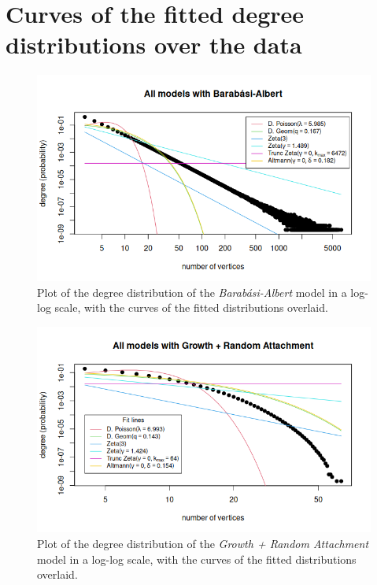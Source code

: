 \newpage
\section{Curves of the fitted degree distributions over the data} \label{app:degseq}

\begin{figure}[ht]
\centering
\includegraphics[width=0.8\linewidth]{figures/degseq_fits/BA_degseq.png}
\caption{Plot of the degree distribution of the \textit{Barabási-Albert} model in a log-log scale, with the curves of the fitted distributions overlaid.}
\label{fig:degseq_BA}
\end{figure}

\begin{figure}[ht]
\centering
\includegraphics[width=0.8\linewidth]{figures/degseq_fits/RA_degseq.png}
\caption{Plot of the degree distribution of the \textit{Growth + Random Attachment} model in a log-log scale, with the curves of the fitted distributions overlaid.}
\label{fig:degseq_RA}
\end{figure}

